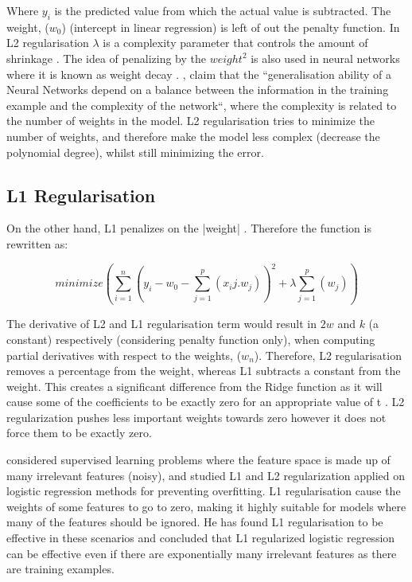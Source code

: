 Where $y_i$ is the predicted value from which the actual value is subtracted. The weight, ($w_0$) (intercept in linear regression) is left of out the penalty function. In L2 regularisation $\lambda$ is a complexity parameter that controls the amount of shrinkage \citep{friedman2001elements}.  The idea of penalizing by the $weight^2$ is also used in neural networks where it is known as weight decay \citep{krogh1992simple,moody1992effective}. \citet{krogh1992simple}, claim that the ``generalisation ability of a Neural Networks depend on a balance between the information in the training example and the complexity of the network``, where the complexity is related to the number of weights in the model. L2 regularisation tries to minimize the number of weights, and therefore make the model less complex (decrease the polynomial degree), whilst still minimizing the error. 


\subsection{L1 Regularisation} 


On the other hand, L1 penalizes on the |weight| \citep{friedman2001elements}. Therefore the function is rewritten as:

\begin{equation}\label{rom_l1}
minimize ( \sum^{n}_{i=1}(y_i - w_0 - \sum^{p}_{j=1}(x_ij.w_j) )^2 + \lambda\sum^{p}_{j=1}(w_j) )
\end{equation}

The derivative of L2 and L1 regularisation term would result in $2w$ and $k$ (a constant) respectively (considering penalty function only), when computing partial derivatives with respect to the weights, ($w_n$). Therefore, L2 regularisation removes a percentage from the weight, whereas L1 subtracts a constant from the weight. This creates a significant difference from the Ridge function as it will cause some of the coefficients to be exactly zero for an appropriate value of t \citep{friedman2001elements}. L2 regularization pushes less important weights towards zero however it does not force them to be exactly zero.

\citet{ng2004feature} considered supervised learning problems where the feature space is made up of many irrelevant features (noisy), and studied L1 and L2 regularization applied on logistic regression methods for preventing overﬁtting. L1 regularisation cause the weights of some features to go to zero, making it highly suitable for models where many of the features should be ignored. He has found L1 regularisation to be effective in these scenarios and concluded that L1 regularized logistic regression can be effective even if there are exponentially many irrelevant features as there are training examples.


